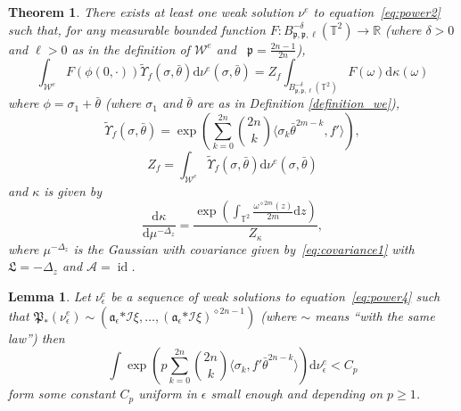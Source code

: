 \documentclass[a4paper,10pt]{article}
\newcommand{\asterisk}{\mathord{*}}
\newcommand{\mathd}{\mathrm{d}}
\newcommand{\tmop}[1]{\ensuremath{\operatorname{#1}}}
\newtheorem{lemma}{Lemma}
\newtheorem{theorem}{Theorem}
\begin{document}
\begin{theorem}
  \label{theorem_polynomialreduction}There exists at least one weak solution
  $\nu^e$ to equation~{\eqref{eq:power2}} such that, for any measurable
  bounded function $F : B^{- \delta}_{\mathfrak{p}, \mathfrak{p}, \ell}
  (\mathbb{T}^2) \rightarrow \mathbb{R}$ (where $\delta > 0$ and $\ell > 0$ as
  in the definition of $\mathcal{W}^e$ and \ $\mathfrak{p} = \frac{2 n - 1}{2
  n}$),
  \begin{equation}
    \int_{\mathcal{W}^e} F (\phi (0, \cdot)) \tilde{\Upsilon}_f (\sigma,
    \bar{\theta}) \mathd \nu^e (\sigma, \bar{\theta}) = Z_f \int_{B^{-
    \delta}_{\mathfrak{p}, \mathfrak{p}, \ell} (\mathbb{T}^2)} F (\omega)
    \mathd \kappa (\omega) \label{eq:powermain}
  \end{equation}
  where $\phi = \sigma_1 + \bar{\theta}$ (where $\sigma_1$ and $\bar{\theta}$
  are as in Definition \ref{definition_we}),
  \[ \tilde{\Upsilon}_f (\sigma, \bar{\theta}) = \exp \left( \sum_{k = 0}^{2
     n} \binom{2 n}{k} \langle \sigma_k \bar{\theta}^{2 m - k}, f' \rangle
     \right), \]
  \[ Z_f = \int_{\mathcal{W}^e} \tilde{\Upsilon}_f (\sigma, \bar{\theta})
     \mathd \nu^e (\sigma, \bar{\theta}) \]
  and $\kappa$ is given by
  \[ \frac{\mathd \kappa}{\mathd \mu^{- \Delta_z}} = \frac{\exp \left(
     \int_{\mathbb{T}^2} \frac{\omega^{\diamond 2 m} (z)}{2 m} \mathd z
     \right)}{Z_{\kappa}}, \]
  where $\mu^{- \Delta_z}$ is the Gaussian with covariance given
  by~{\eqref{eq:covariance1}} with $\mathfrak{L} = - \Delta_z$ and
  $\mathcal{A} = \tmop{id}$.
\end{theorem}

\begin{lemma}
  \label{lemma_uniform}Let $\nu^e_{\epsilon}$ be a sequence of weak solutions
  to equation~{\eqref{eq:power4}} such that $\mathfrak{P}_{\asterisk}
  (\nu_{\epsilon}^e) \sim (\mathcal{\mathfrak{a}}_{\epsilon} \asterisk
  \mathcal{I} \xi, \ldots, (\mathcal{\mathfrak{a}}_{\epsilon} \asterisk
  \mathcal{I} \xi)^{\diamond 2 n - 1})$ (where $\sim$ means ``with the same
  law'') then
  \[ \int \exp \left( p \sum_{k = 0}^{2 n} \binom{2 n}{k} \langle \sigma_k,
     f'  \bar{\theta}^{2 n - k} \rangle \right) \mathd \nu_{\epsilon}^e < C_p
  \]
  form some constant $C_p$ uniform in $\epsilon$ small enough and depending on
  $p \geq 1$.
\end{lemma}
\end{document}
